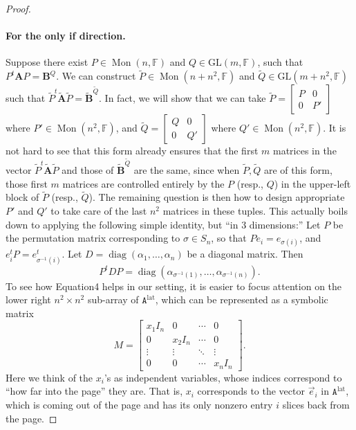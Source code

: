 \documentclass[10pt,a4paper]{article}
\begin{document}
\begin{proof}
\paragraph{For the only if direction.}
Suppose there exist $P\in\operatorname{Mon}(n,\mathbb F)$ and $Q\in\mathrm{GL}(m,\mathbb F)$, such that $P^t\mathbf A P=\mathbf B^Q$. We can construct $\widetilde P\in\operatorname{Mon}(n+n^2,\mathbb F)$ and $\widetilde Q\in\mathrm{GL}(m+n^2,\mathbb F)$ such that $\widetilde P^t\widetilde{\mathbf A}\widetilde P=\widetilde{\mathbf B}^{\widetilde Q}$. In fact, we will show that we can take $\widetilde P=\begin{bmatrix}P&0\\0&P'\end{bmatrix}$ where $P'\in\operatorname{Mon}(n^2,\mathbb F)$, and $\widetilde Q=\begin{bmatrix}Q&0\\0&Q'\end{bmatrix}$ where $Q'\in\operatorname{Mon}(n^2,\mathbb F)$. It is not hard to see that this form already ensures that the first $m$ matrices in the vector $\widetilde P^t\widetilde{\mathbf A}\widetilde P$ and those of $\widetilde{\mathbf B}^{\widetilde Q}$ are the same, since when $\widetilde P,\widetilde Q$ are of this form, those first $m$ matrices are controlled entirely by the $P$ (resp., $Q$) in the upper-left block of $\widetilde P$ (resp., $\widetilde Q$).
The remaining question is then how to design appropriate $P'$ and $Q'$ to take care of the last $n^2$ matrices in these tuples. This actually boils down to applying the following simple identity, but ``in 3 dimensions:'' Let $P$ be the permutation matrix corresponding to $\sigma\in S_n$, so that $Pe_i=e_{\sigma(i)}$, and $e_i^tP=e_{\sigma^{-1}(i)}^t$. Let $D=\operatorname{diag}(\alpha_1,\ldots,\alpha_n)$ be a diagonal matrix. Then
\begin{equation}\tag{4}P^tDP=\operatorname{diag}(\alpha_{\sigma^{-1}(1)},\ldots,\alpha_{\sigma^{-1}(n)}).\end{equation}
To see how Equation4 helps in our setting, it is easier to focus attention on the lower right $n^2\times n^2$ sub-array of $\mathtt A^{\mathrm{lat}}$, which can be represented as a symbolic matrix
\[M=\begin{bmatrix}x_1I_n&0&\cdots&0\\0&x_2I_n&\cdots&0\\\vdots&\vdots&\ddots&\vdots\\0&0&\cdots&x_nI_n\end{bmatrix}.\]
Here we think of the $x_i$'s as independent variables, whose indices correspond to ``how far into the page'' they are. That is, $x_i$ corresponds to the vector $\vec e_i$ in $\mathtt A^{\mathrm{lat}}$, which is coming out of the page and has its only nonzero entry $i$ slices back from the page.

\end{proof}
\end{document}
